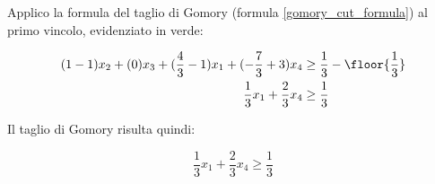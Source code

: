 \documentclass[\main/main.tex]{subfiles}
\begin{document}
Applico la formula del taglio di Gomory (formula \ref{gomory_cut_formula}) al primo vincolo, evidenziato in verde:

\begin{align*}
  (1-1)x_2 + (0)x_3 + (\frac{4}{3}-1)x_1 + (-\frac{7}{3} + 3)x_4 & \geq \frac{1}{3} - \floor{\frac{1}{3}} \\
  \frac{1}{3}x_1 + \frac{2}{3}x_4                                & \geq \frac{1}{3}
\end{align*}

Il taglio di Gomory risulta quindi:

\[
  \frac{1}{3}x_1 + \frac{2}{3}x_4 \geq \frac{1}{3}
\]
\end{document}
